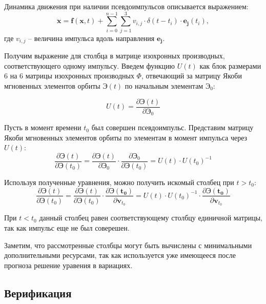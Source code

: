 Динамика движения при наличии псевдоимпульсов описывается выражением:
\begin{equation*}
    \ddot{\mathbf{x}} = \mathbf{f}(\mathbf{x}, t) +
        \sum_{i=0}^{n-1} \sum_{j=1}^{3} v_{i,j} 
                    \cdot \delta (t - t_i) \cdot \mathbf{e_j} (t_i),
\end{equation*}
где $v_{i,j}$ -- величина импульса вдоль направления $\mathbf{e_j}$.

Получим выражение для столбца в матрице изохронных производных, соответствующего одному импульсу.
Введем функцию $U(t)$ как блок размерами 6 на 6 матрицы изохронных производных $\Phi$, отвечающий за
матрицу Якоби мгновенных элементов орбиты $\mathbf{\textbf{Э}}(t)$ по начальным элементам 
$\mathbf{\textbf{Э}}_0$:

\begin{equation*}
    U(t) = \frac{\partial \mathbf{\textbf{Э}}(t)}{\partial \mathbf{\textbf{Э}}_0}
\end{equation*}

Пусть в момент времени $t_0$ был совершен псевдоимпульс.
Представим матрицу Якоби мгновенных элементов орбиты по элементам в момент импульса через $U(t)$:
\begin{equation*}
    \frac{\partial \mathbf{\textbf{Э}}(t)}{\partial \mathbf{\textbf{Э}}(t_0)} = 
    \frac{\partial \mathbf{\textbf{Э}}(t)}{\partial \mathbf{\textbf{Э}}_0} \cdot
    \frac{\partial \mathbf{\textbf{Э}}_0}{\partial \mathbf{\textbf{Э}}(t_0)} = 
    U(t) \cdot U(t_0)^{-1}
\end{equation*}

Используя полученные уравнения, можно получить искомый столбец при $t > t_0$:
\begin{equation*}
    \frac{\partial \mathbf{\textbf{Э}}(t)}{\partial \mathbf{\textbf{Э}}(t_0)} = 
    \frac{\partial \mathbf{\textbf{Э}}(t)}{\partial \mathbf{\textbf{Э}}(t_0)} \cdot
    \frac{\partial \mathbf{\textbf{Э}(t_0)}}{\partial \mathbf{v}_{t_0}} =
    U(t) \cdot U(t_0)^{-1} \cdot
    \frac{\partial \mathbf{\textbf{Э}(t_0)}}{\partial \mathbf{v}_{t_0}}
\end{equation*}

При $t < t_0$ данный столбец равен соответствующему столбцу единичной матрицы, 
так как импульс еще не был соверешен.

Заметим, что рассмотренные столбцы могут быть вычислены с минимальными дополнительными
ресурсами, так как используется уже имеющееся после прогноза решение уравения в вариациях.

\subsection{Верификация}


